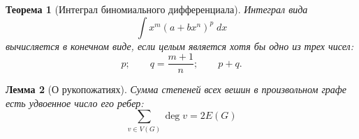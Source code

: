 \documentclass[a4paper,11pt]{article} %
\theoremstyle{plain}
\newtheorem{theorem}{Теорема}[section]
\theoremstyle{plain}
\newtheorem{lemma}[theorem]{Лемма}
\theoremstyle{remark}
\begin{document}
		\begin{theorem}[Интеграл биномиального дифференциала]
			Интеграл вида
			$$\displaystyle \int x^m \left( a + b x^n \right)^p \; dx$$
			вычисляется в конечном виде, если целым является хотя бы одно из трех чисел:
			$$p; \qquad q = \dfrac{m+1}{n}; \qquad p + q.$$
		\end{theorem}
	
		\begin{lemma}[О рукопожатиях]
			Сумма степеней всех вешин в произвольном графе есть удвоенное число его ребер:
			$$\sum \limits_{v \in V \left( G \right)} \deg{v} = 2 E \left( G \right)$$
		\end{lemma}
		
\end{document}
